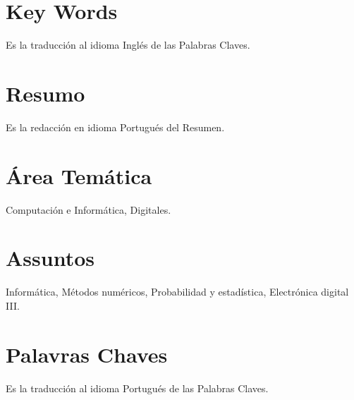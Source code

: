 \section*{Key Words}
Es la traducción al idioma Inglés de las Palabras Claves.
\vspace{11pt}

\newpage
\section*{Resumo}
Es la redacción en idioma Portugués del Resumen.
\vspace{11pt}

\section*{Área Temática}
Computación e Informática, Digitales.
\vspace{11pt}

\section*{Assuntos}
Informática, Métodos numéricos, Probabilidad y estadística, Electrónica digital III.
\vspace{11pt}

\section*{Palavras Chaves}
Es la traducción al idioma Portugués de las Palabras Claves.
\vspace{11pt}







		




 








